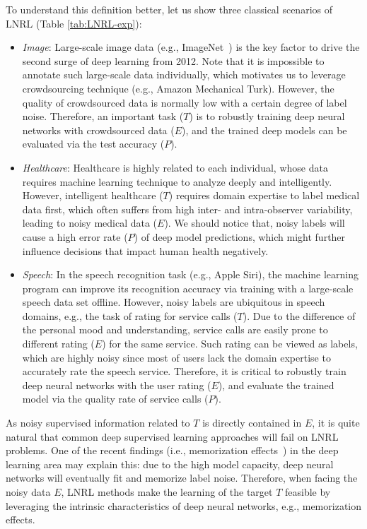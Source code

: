 To understand this definition better, let us show three classical scenarios of LNRL (Table \ref{tab:LNRL-exp}):
\begin{itemize}[leftmargin=*]
\item \textit{Image}: Large-scale image data (e.g., ImageNet~) 
is the key factor to drive the second surge of deep learning from 2012. Note that it is impossible to annotate such large-scale data individually, which motivates us to leverage crowdsourcing technique (e.g., Amazon Mechanical Turk). However, the quality of crowdsourced data is normally low with a certain degree of label noise. Therefore, an important task ($T$) is to robustly training deep neural networks with crowdsourced data ($E$), and the trained deep models can be evaluated via the test accuracy ($P$).
\item \textit{Healthcare}: Healthcare is highly related to each individual, whose data requires machine learning technique to analyze deeply and intelligently. However, intelligent healthcare ($T$) requires domain expertise to label medical data first, which often suffers from high inter- and intra-observer variability, leading to noisy medical data ($E$). We should notice that, noisy labels will cause a high error rate ($P$) of deep model predictions, which might further influence decisions that impact human health negatively.
\item \textit{Speech}: In the speech recognition task (e.g., Apple Siri), the machine learning program can improve its recognition accuracy via training with a large-scale speech data set offline. However, noisy labels are ubiquitous in speech domains, e.g., the task of rating for service calls ($T$). Due to the difference of the personal mood and understanding, service calls are easily prone to different rating ($E$) for the same service. Such rating can be viewed as labels, which are highly noisy since most of users lack the domain expertise to accurately rate the speech service. Therefore, it is critical to robustly train deep neural networks with the user rating ($E$), and evaluate the trained model via the quality rate of service calls ($P$).
\end{itemize}
As noisy supervised information related to $T$ is directly contained in $E$, it is quite natural that common deep supervised learning approaches will fail on LNRL problems. One of the recent findings (i.e., memorization effects~) in the deep learning area may explain this: due to the high model capacity, deep neural networks will eventually fit and memorize label noise. Therefore, when facing the noisy data $E$, LNRL methods make the learning of the target $T$ feasible by leveraging the intrinsic characteristics of deep neural networks, e.g., memorization effects.

